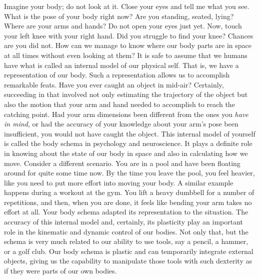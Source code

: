 
Imagine your body; do not look at it. Close your eyes and tell me what you see. What is the pose of your body right now? Are you standing, seated, lying? Where are your arms and hands? Do not open your eyes just yet. Now, touch your left knee with your right hand. Did you struggle to find your knee? Chances are you did not. How can we manage to know where our body parts are in space at all times without even looking at them? It is safe to assume that we humans have what is called an internal model of our physical self. That is, we have a representation of our body. Such a representation allows us to accomplish remarkable feats. Have you ever caught an object in mid-air? Certainly, succeeding in that involved not only estimating the trajectory of the object but also the motion that your arm and hand needed to accomplish to reach the catching point. Had your arm dimensions been different from the ones you \textit{have in mind}, or had the accuracy of your knowledge about your arm's pose been insufficient, you would not have caught the object. This internal model of yourself is called the body schema in psychology and neuroscience. It plays a definite role in knowing about the state of our body in space and also in calculating how we move. Consider a different scenario. You are in a pool and have been floating around for quite some time now. By the time you leave the pool, you feel heavier, like you need to put more effort into moving your body. A similar example happens during a workout at the gym. You lift a heavy dumbbell for a number of repetitions, and then, when you are done, it feels like bending your arm takes no effort at all. Your body schema adapted its representation to the situation. The accuracy of this internal model and, certainly, its plasticity play an important role in the kinematic and dynamic control of our bodies. Not only that, but the schema is very much related to our ability to use tools, say a pencil, a hammer, or a golf club. Our body schema is plastic and can temporarily integrate external objects, giving us the capability to manipulate those tools with such dexterity as if they were parts of our own bodies.

